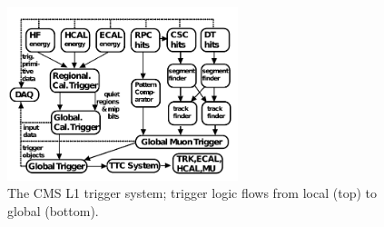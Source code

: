 \begin{figure}[hb!]
\centering
\includegraphics[width=0.6\textwidth]{figs/CMS-TRG-12-001_Figure_002.pdf}
\caption{The CMS L1 trigger system; trigger logic flows from local (top) to global (bottom).}
\label{fig:trigger}
\end{figure}
